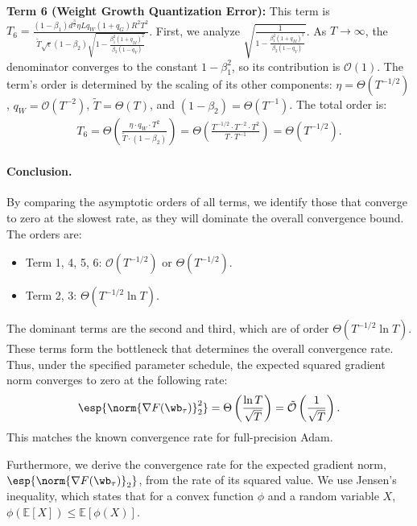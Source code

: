 \documentclass[11pt, letterpaper]{article}
\begin{document}
\textbf{Term 6 (Weight Growth Quantization Error):} This term is $T_6 = \frac{(1-\beta_1)d^\frac{3}{2} \eta L q_W(1+q_G)R^2 T^2}{\tilde{T}\sqrt{\epsilon}(1-\beta_2)\sqrt{1-\frac{\beta_1^2(1+q_M)^2}{\beta_2(1-q_V)}}}$.
First, we analyze $\sqrt{\frac{1}{1-\frac{\beta_1^2(1+q_M)^2}{\beta_2(1-q_V)}}}$. As $T \to \infty$, the denominator converges to the constant $1-\beta_1^2$, so its contribution is $\mathcal{O}(1)$. The term's order is determined by the scaling of its other components: $\eta=\Theta(T^{-1/2})$, $q_W=\mathcal{O}(T^{-2})$, $\tilde{T}=\Theta(T)$, and $(1-\beta_2)=\Theta(T^{-1})$. The total order is:
\begin{align*}
    T_6 = \Theta\left(\frac{\eta \cdot q_W \cdot T^2}{\tilde{T} \cdot (1-\beta_2)}\right) = \Theta\left(\frac{T^{-1/2} \cdot T^{-2} \cdot T^2}{T \cdot T^{-1}}\right) = \Theta(T^{-1/2}).
\end{align*}

\paragraph{Conclusion.}
By comparing the asymptotic orders of all terms, we identify those that converge to zero at the slowest rate, as they will dominate the overall convergence bound. The orders are:
\begin{itemize}[leftmargin=*]
    \item Term 1, 4, 5, 6: $\mathcal{O}(T^{-1/2})$ or $\Theta(T^{-1/2})$.
    \item Term 2, 3: $\Theta(T^{-1/2} \ln T)$.
\end{itemize}
The dominant terms are the second and third, which are of order $\Theta(T^{-1/2}\ln T)$. These terms form the bottleneck that determines the overall convergence rate. Thus, under the specified parameter schedule, the expected squared gradient norm converges to zero at the following rate:
\begin{align*}
    \esp{\norm{\nabla F(\wb_{\tau})}_2^2} = \Theta\left(\frac{\ln T}{\sqrt{T}}\right) = \tilde{\mathcal{O}}\left(\frac{1}{\sqrt{T}}\right).
\end{align*}
This matches the known convergence rate for full-precision Adam.

Furthermore, we derive the convergence rate for the expected gradient norm, $\esp{\norm{\nabla F(\wb_{\tau})}_2}$, from the rate of its squared value. We use Jensen's inequality, which states that for a convex function $\phi$ and a random variable $X$, $\phi(\mathbb{E}[X]) \le \mathbb{E}[\phi(X)]$.
\end{document}
